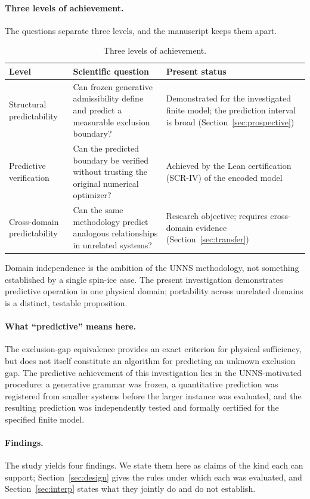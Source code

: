 \documentclass[11pt,a4paper]{article}
\theoremstyle{plain}
\theoremstyle{definition}
\theoremstyle{remark}
\begin{document}
\paragraph{Three levels of achievement.} The questions separate three levels, and the manuscript keeps them apart.
\begin{table}[t]\centering\small\caption{Three levels of achievement.}\label{tab:levels}
\begin{tabularx}{\linewidth}{@{}p{3.0cm}Xp{3.7cm}@{}}
\toprule
Level & Scientific question & Present status\\
\midrule
Structural predictability & Can frozen generative admissibility define and predict a measurable exclusion boundary? & Demonstrated for the investigated finite model; the prediction interval is broad (Section~\ref{sec:prospective})\\[0.3em]
Predictive verification & Can the predicted boundary be verified without trusting the original numerical optimizer? & Achieved by the Lean certification (SCR-IV) of the encoded model\\[0.3em]
Cross-domain predictability & Can the same methodology predict analogous relationships in unrelated systems? & Research objective; requires cross-domain evidence (Section~\ref{sec:transfer})\\
\bottomrule
\end{tabularx}
\end{table}
Domain independence is the ambition of the UNNS methodology, not something established by a single spin-ice case. The present investigation demonstrates predictive operation in one physical domain; portability across unrelated domains is a distinct, testable proposition.

\paragraph{What ``predictive'' means here.}\label{sec:predmeaning} The exclusion-gap equivalence provides an exact criterion for physical sufficiency, but does not itself constitute an algorithm for predicting an unknown exclusion gap. The predictive achievement of this investigation lies in the UNNS-motivated procedure: a generative grammar was frozen, a quantitative prediction was registered from smaller systems before the larger instance was evaluated, and the resulting prediction was independently tested and formally certified for the specified finite model.

\paragraph{Findings.} The study yields four findings. We state them here as claims of the kind each can support; Section~\ref{sec:design} gives the rules under which each was evaluated, and Section~\ref{sec:interp} states what they jointly do and do not establish.
\end{document}
